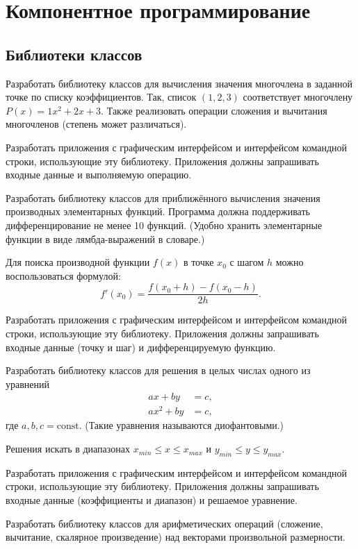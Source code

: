 \section{Компонентное программирование}

\subsection{Библиотеки классов}

\task Разработать библиотеку классов для вычисления значения
многочлена в заданной точке по списку коэффициентов. Так, список
$(1, 2, 3)$ соответствует многочлену $P(x)=1x^2+2x+3.$ Также
реализовать операции сложения и вычитания многочленов (степень может
различаться).

Разработать приложения с графическим интерфейсом и интерфейсом
командной строки, использующие эту библиотеку. Приложения должны
запрашивать входные данные и выполняемую операцию.

\task Разработать библиотеку классов для приближённого вычисления
значения производных элементарных функций. Программа должна
поддерживать дифференцирование не менее 10 функций. (Удобно хранить
элементарные функции в виде лямбда-выражений в словаре.)

Для поиска производной функции $f(x)$ в точке $x_0$ с шагом $h$ можно
воспользоваться формулой:
\[
f'(x_0) = \frac{f(x_0+h) - f(x_0-h)}{2h}.
\]

Разработать приложения с графическим интерфейсом и интерфейсом
командной строки, использующие эту библиотеку. Приложения должны
запрашивать входные данные (точку и шаг) и дифференцируемую функцию.

\task Разработать библиотеку классов для решения в целых числах
одного из уравнений
\begin{align*}
a x + b y &= c,\\
a x^2 + b y &= c,
\end{align*}
где $a, b, c = \mathrm{const}.$ (Такие уравнения называются
диофантовыми.)

Решения искать в диапазонах $x_{min}\leqslant x \leqslant x_{max}$ и
$y_{min}\leqslant y \leqslant y_{max}.$

Разработать приложения с графическим интерфейсом и интерфейсом
командной строки, использующие эту библиотеку. Приложения должны
запрашивать входные данные (коэффициенты и диапазон) и решаемое
уравнение.

\task Разработать библиотеку классов для арифметических операций
(сложение, вычитание, скалярное произведение) над векторами
произвольной размерности.

